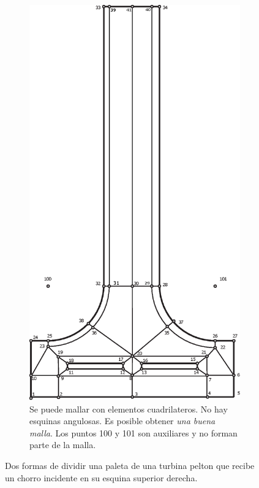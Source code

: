 \begin{figure}[htb!]
\begin{subfigure}{0.49\textwidth}
		\includegraphics[width=.7\linewidth]{fig/divisionPelton2.eps}
		\caption{Se puede mallar con elementos cuadrilateros. No hay esquinas angulosas. Es posible obtener \textit{una buena malla}. Los puntos 100 y 101 son auxiliares y no forman parte de la malla.}
		\label{fig:buendivisiondominio}
	\end{subfigure}
	\caption{Dos formas de dividir una paleta de una turbina pelton que recibe un chorro incidente en su esquina superior derecha.}
\end{figure}
